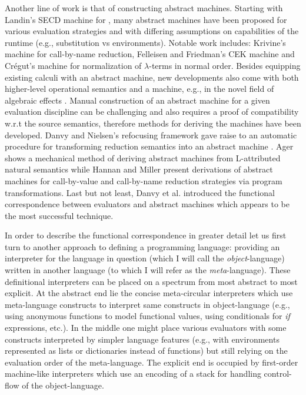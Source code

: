 Another line of work is that of constructing abstract machines.
Starting with Landin's SECD machine \cite{landin-secd} for \LC{}, many abstract machines have been proposed for various evaluation strategies and with differing assumptions on capabilities of the runtime (e.g., substitution vs environments).
Notable work includes: Krivine's machine \cite{krivine-machine} for call-by-name reduction, Felleisen and Friedman's CEK machine \cite{felleisen-cek} and Cr\'{e}gut's machine \cite{cregut-normal} for normalization of $\lambda$-terms in normal order.
Besides equipping existing calculi with an abstract machine, new developments also come with both higher-level operational semantics and a machine, e.g., in the novel field of algebraic effects \cite{biernacki-algebraic-effects,hillerstrom-algebraic-effects}.
Manual construction of an abstract machine for a given evaluation discipline can be challenging and also requires a proof of compatibility w.r.t the source semantics, therefore methods for deriving the machines have been developed.
Danvy and Nielsen's refocusing framework \cite{refocusing} gave raise to an automatic procedure for transforming reduction semantics into an abstract machine \cite{refocusing-auto,refocusing-generalized}.
Ager shows a mechanical method of deriving abstract machines from L-attributed natural semantics \cite{ager-natural-semantics} while Hannan and Miller present derivations of abstract machines for call-by-value and call-by-name reduction strategies \cite{hannan-big-step-to-am} via program transformations.
Last but not least, Danvy et al. introduced the functional correspondence between evaluators and abstract machines \cite{functional-correspondence} which appears to be the most successful technique.

In order to describe the functional correspondence in greater detail let us first turn to another approach to defining a programming language: providing an interpreter for the language in question (which I will call the \emph{object}-language) written in another language (to which I will refer as the \emph{meta}-language).
These definitional interpreters \cite{reynolds} can be placed on a spectrum from most abstract to most explicit.
At the abstract end lie the concise meta-circular interpreters which use meta-language constructs to interpret same constructs in object-language (e.g., using anonymous functions to model functional values, using conditionals for \textit{if} expressions, etc.).
In the middle one might place various evaluators with some constructs interpreted by simpler language features (e.g., with environments represented as lists or dictionaries instead of functions) but still relying on the evaluation order of the meta-language.
The explicit end is occupied by first-order machine-like interpreters which use an encoding of a stack for handling control-flow of the object-language.

